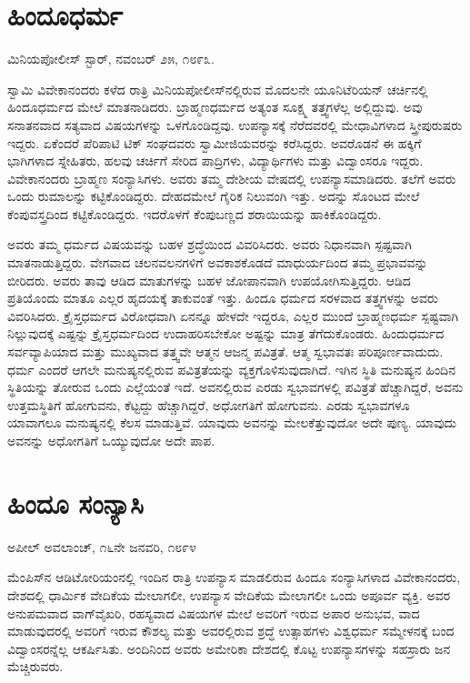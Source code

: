 \section*{ಹಿಂದೂಧರ್ಮ}

\begin{flushright}
ಮಿನಿಯಪೋಲೀಸ್ ಸ್ಟಾರ್, ನವಂಬರ್ ೨೫, ೧೮೯೩.
\end{flushright}

 ಸ್ವಾಮಿ ವಿವೇಕಾನಂದರು ಕಳೆದ ರಾತ್ರಿ ಮಿನಿಯಪೋಲೀಸ್‍ನಲ್ಲಿರುವ ಮೊದಲನೇ ಯೂನಿಟೆರಿಯನ್ ಚರ್ಚಿನಲ್ಲಿ ಹಿಂದೂಧರ್ಮದ ಮೇಲೆ ಮಾತನಾಡಿದರು. ಬ್ರಾಹ್ಮಣಧರ್ಮದ ಅತ್ಯಂತ ಸೂಕ್ಷ್ಮ ತತ್ತ್ವಗಳೆಲ್ಲ ಅಲ್ಲಿದ್ದುವು. ಅವು ಸನಾತನವಾದ ಸತ್ಯವಾದ ವಿಷಯಗಳನ್ನು ಒಳಗೊಂಡಿದ್ದವು. ಉಪನ್ಯಾಸಕ್ಕೆ ನೆರೆದವರಲ್ಲಿ ಮೇಧಾವಿಗಳಾದ ಸ್ತ್ರೀಪುರುಷರು ಇದ್ದರು. ಏಕೆಂದರೆ ಪೆರಿಪಾಟಿ ಟಿಕ್ ಸಂಘದವರು ಸ್ವಾಮೀಜಿಯವರನ್ನು ಕರೆಸಿದ್ದರು. ಅವರೊಡನೆ ಈ ಹಕ್ಕಿಗೆ ಭಾಗಿಗಳಾದ ಸ್ನೇಹಿತರು, ಹಲವು ಚರ್ಚಿಗೆ ಸೇರಿದ ಪಾದ್ರಿಗಳು, ವಿದ್ಯಾರ್ಥಿಗಳು ಮತ್ತು ವಿದ್ವಾಂಸರೂ ಇದ್ದರು. ವಿವೇಕಾನಂದರು ಬ್ರಾಹ್ಮಣ ಸಂನ್ಯಾಸಿಗಳು. ಅವರು ತಮ್ಮ ದೇಶೀಯ ವೇಷದಲ್ಲಿ ಉಪನ್ಯಾಸಮಾಡಿದರು. ತಲೆಗೆ ಅವರು ಒಂದು ರುಮಾಲನ್ನು ಕಟ್ಟಿಕೊಂಡಿದ್ದರು. ದೇಹದಮೇಲೆ ಗೈರಿಕ ನಿಲುವಂಗಿ ಇತ್ತು. ಅದನ್ನು ಸೊಂಟದ ಮೇಲೆ ಕೆಂಪುವಸ್ತ್ರದಿಂದ ಕಟ್ಟಿಕೊಂಡಿದ್ದರು. ಇದರೊಳಗೆ ಕೆಂಪುಬಣ್ಣದ ಶರಾಯಿಯನ್ನು ಹಾಕಿಕೊಂಡಿದ್ದರು. 

 ಅವರು ತಮ್ಮ ಧರ್ಮದ ವಿಷಯವನ್ನು ಬಹಳ ಶ್ರದ್ಧೆಯಿಂದ ವಿವರಿಸಿದರು. ಅವರು ನಿಧಾನವಾಗಿ ಸ್ಪಷ್ಟವಾಗಿ ಮಾತನಾಡುತ್ತಿದ್ದರು. ವೇಗವಾದ ಚಲನವಲನಗಳಿಗೆ ಅವಕಾಶಕೊಡದೆ ಮಾಧುರ್ಯದಿಂದ ತಮ್ಮ ಪ್ರಭಾವವನ್ನು ಬೀರಿದರು. ಅವರು ತಾವು ಆಡಿದ ಮಾತುಗಳನ್ನು ಬಹಳ ಜೋಪಾನವಾಗಿ ಉಪಯೋಗಿಸುತ್ತಿದ್ದರು. ಆಡಿದ ಪ್ರತಿಯೊಂದು ಮಾತೂ ಎಲ್ಲರ ಹೃದಯಕ್ಕೆ ತಾಕುವಂತೆ ಇತ್ತು. ಹಿಂದೂ ಧರ್ಮದ ಸರಳವಾದ ತತ್ತ್ವಗಳನ್ನು ಅವರು ವಿವರಿಸಿದರು. ಕ್ರೈಸ್ತಧರ್ಮದ ವಿರೋಧವಾಗಿ ಏನನ್ನೂ ಹೇಳದೇ ಇದ್ದರೂ, ಎಲ್ಲರ ಮುಂದೆ ಬ್ರಾಹ್ಮಣಧರ್ಮ ಸ್ಪಷ್ಟವಾಗಿ ನಿಲ್ಲುವುದಕ್ಕೆ ಎಷ್ಟನ್ನು ಕ್ರೈಸ್ತಧರ್ಮದಿಂದ ಉದಾಹರಿಸಬೇಕೋ ಅಷ್ಟನ್ನು ಮಾತ್ರ ತೆಗೆದುಕೊಂಡರು. ಹಿಂದುಧರ್ಮದ ಸರ್ವವ್ಯಾಪಿಯಾದ ಮತ್ತು ಮುಖ್ಯವಾದ ತತ್ತ್ವವೇ ಆತ್ಮನ ಆಜನ್ಮ ಪವಿತ್ರತೆ. ಆತ್ಮ ಸ್ವಭಾವತಃ ಪರಿಪೂರ್ಣವಾದುದು. ಧರ್ಮ ಎಂದರೆ ಆಗಲೇ ಮನುಷ್ಯನಲ್ಲಿರುವ ಪವಿತ್ರತೆಯನ್ನು ವ್ಯಕ್ತಗೊಳಿಸುವುದಾಗಿದೆ. ಇಗಿನ ಸ್ಥಿತಿ ಮನುಷ್ಯನ ಹಿಂದಿನ ಸ್ಥಿತಿಯನ್ನು ತೋರುವ ಒಂದು ಎಲ್ಲೆಯಂತೆ ಇದೆ. ಅವನಲ್ಲಿರುವ ಎರಡು ಸ್ವಭಾವಗಳಲ್ಲಿ ಪವಿತ್ರತೆ ಹೆಚ್ಚಾಗಿದ್ದರೆ, ಅವನು ಉತ್ತಮಸ್ಥಿತಿಗೆ ಹೋಗುವನು, ಕೆಟ್ಟದ್ದು ಹೆಚ್ಚಾಗಿದ್ದರೆ, ಅಧೋಗತಿಗೆ ಹೋಗುವನು. ಎರಡು ಸ್ವಭಾವಗಳೂ ಯಾವಾಗಲೂ ಮನುಷ್ಯನಲ್ಲಿ ಕೆಲಸ ಮಾಡುತ್ತಿವೆ. ಯಾವುದು ಅವನನ್ನು ಮೇಲಕೆತ್ತುವುದೋ ಅದೇ ಪುಣ್ಯ. ಯಾವುದು ಅವನನ್ನು ಅಧೋಗತಿಗೆ ಒಯ್ಯುವುದೋ ಅದೇ ಪಾಪ.


\section*{ಹಿಂದೂ ಸಂನ್ಯಾಸಿ}

\begin{flushright}
ಅಪೀಲ್ ಅವಲಾಂಚ್, ೧೬ನೇ ಜನವರಿ, ೧೮೯೪
\end{flushright}

 ಮೆಂಪಿಸ್‍ನ ಆಡಿಟೋರಿಯಂನಲ್ಲಿ ಇಂದಿನ ರಾತ್ರಿ ಉಪನ್ಯಾಸ ಮಾಡಲಿರುವ ಹಿಂದೂ ಸಂನ್ಯಾಸಿಗಳಾದ ವಿವೇಕಾನಂದರು, ದೇಶದಲ್ಲಿ ಧಾರ್ಮಿಕ ವೇದಿಕೆಯ ಮೇಲಾಗಲೀ, ಉಪನ್ಯಾಸ ವೇದಿಕೆಯ ಮೇಲಾಗಲೀ ಒಂದು ಅಪೂರ್ವ ವ್ಯಕ್ತಿ. ಅವರ ಅನುಪಮವಾದ ವಾಗ್‍ವೈಖರಿ, ರಹಸ್ಯವಾದ ವಿಷಯಗಳ ಮೇಲೆ ಅವರಿಗೆ ಇರುವ ಅಪಾರ ಅನುಭವ, ವಾದ ಮಾಡುವುದರಲ್ಲಿ ಅವರಿಗೆ ಇರುವ ಕೌಶಲ್ಯ ಮತ್ತು ಅವರಲ್ಲಿರುವ ಶ್ರದ್ಧೆ ಉತ್ಸಾಹಗಳು ವಿಶ್ವಧರ್ಮ ಸಮ್ಮೇಳನಕ್ಕೆ ಬಂದ ವಿದ್ವಾಂಸರನ್ನೆಲ್ಲ ಆಕರ್ಷಿಸಿತು. ಅಂದಿನಿಂದ ಅವರು ಅಮೇರಿಕಾ ದೇಶದಲ್ಲಿ ಕೊಟ್ಟ ಉಪನ್ಯಾಸಗಳನ್ನು ಸಹಸ್ರಾರು ಜನ ಮೆಚ್ಚಿರುವರು. 

